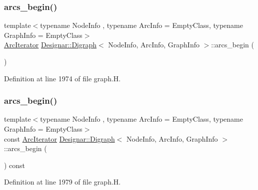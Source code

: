 \subsubsection{\texorpdfstring{arcs\+\_\+begin()}{arcs\_begin()}\hspace{0.1cm}{\footnotesize\ttfamily [1/4]}}
{\footnotesize\ttfamily template$<$typename Node\+Info , typename Arc\+Info  = Empty\+Class, typename Graph\+Info  = Empty\+Class$>$ \\
\hyperlink{class_designar_1_1_digraph_1_1_arc_iterator}{Arc\+Iterator} \hyperlink{class_designar_1_1_digraph}{Designar\+::\+Digraph}$<$ Node\+Info, Arc\+Info, Graph\+Info $>$\+::arcs\+\_\+begin (\begin{DoxyParamCaption}{ }\end{DoxyParamCaption})\hspace{0.3cm}{\ttfamily [inline]}}



Definition at line 1974 of file graph.\+H.

\mbox{\label{class_designar_1_1_digraph_a1334cd9030f2a409f03a611bb472f5cb}} 
\subsubsection{\texorpdfstring{arcs\+\_\+begin()}{arcs\_begin()}\hspace{0.1cm}{\footnotesize\ttfamily [2/4]}}
{\footnotesize\ttfamily template$<$typename Node\+Info , typename Arc\+Info  = Empty\+Class, typename Graph\+Info  = Empty\+Class$>$ \\
const \hyperlink{class_designar_1_1_digraph_1_1_arc_iterator}{Arc\+Iterator} \hyperlink{class_designar_1_1_digraph}{Designar\+::\+Digraph}$<$ Node\+Info, Arc\+Info, Graph\+Info $>$\+::arcs\+\_\+begin (\begin{DoxyParamCaption}{ }\end{DoxyParamCaption}) const\hspace{0.3cm}{\ttfamily [inline]}}



Definition at line 1979 of file graph.\+H.

\mbox{\label{class_designar_1_1_digraph_a3c1eeda482f59951e1191ea2e0dd514a}} 
